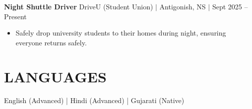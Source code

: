 \documentclass[10pt,a4paper]{article}
\begin{document}
\textbf{Night Shuttle Driver} \hfill DriveU (Student Union) $|$ Antigonish, NS $|$ Sept 2025 -- Present
\begin{itemize}
\item Safely drop university students to their homes during night, ensuring everyone returns safely.
\end{itemize}

\section*{LANGUAGES}
English (Advanced) | Hindi (Advanced) | Gujarati (Native)
\end{document}
